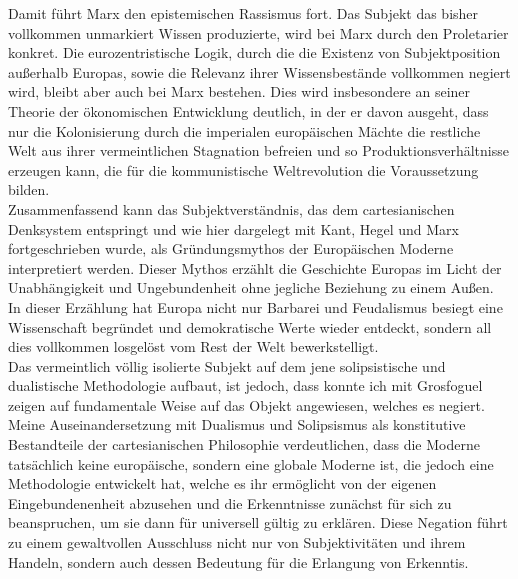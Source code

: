 \noindent Damit führt Marx den epistemischen Rassismus fort. Das Subjekt das bisher
vollkommen unmarkiert Wissen produzierte, wird bei Marx durch den Proletarier
konkret. Die eurozentristische Logik, durch die die Existenz von
Subjektposition außerhalb Europas, sowie die Relevanz ihrer Wissensbestände
vollkommen negiert wird, bleibt aber auch bei Marx bestehen.\footnotemark {}  Dies wird
insbesondere an seiner Theorie der ökonomischen Entwicklung deutlich, in der er
davon ausgeht, dass nur die Kolonisierung durch die imperialen europäischen
Mächte die restliche Welt aus ihrer vermeintlichen Stagnation befreien und so
Produktionsverhältnisse erzeugen kann, die für die kommunistische
Weltrevolution die Voraussetzung bilden.\\

\noindent Zusammenfassend kann das Subjektverständnis, das dem cartesianischen Denksystem
entspringt und wie hier dargelegt mit Kant, Hegel und Marx fortgeschrieben
wurde, als Gründungsmythos der Europäischen Moderne interpretiert werden.\footnotemark {} 
Dieser Mythos erzählt die Geschichte Europas im Licht der Unabhängigkeit und
Ungebundenheit ohne jegliche Beziehung zu einem Außen.\\
 In dieser Erzählung hat
Europa nicht nur Barbarei und Feudalismus besiegt eine Wissenschaft begründet
und demokratische Werte wieder entdeckt, sondern all dies vollkommen losgelöst
vom Rest der Welt bewerkstelligt.\footnotemark {}\\
 Das vermeintlich völlig isolierte Subjekt
auf dem jene solipsistische und dualistische Methodologie aufbaut, ist jedoch,
dass konnte ich mit Grosfoguel zeigen auf fundamentale Weise auf das Objekt
angewiesen, welches es negiert.\\
 Meine Auseinandersetzung mit Dualismus und
Solipsismus als konstitutive Bestandteile der cartesianischen Philosophie
verdeutlichen, dass die Moderne tatsächlich keine europäische, sondern eine
globale Moderne ist, die jedoch eine Methodologie entwickelt hat, welche es ihr
ermöglicht von der eigenen Eingebundenenheit abzusehen und die Erkenntnisse
zunächst für sich zu beanspruchen, um sie dann für universell gültig zu
erklären. Diese Negation führt zu einem gewaltvollen Ausschluss nicht nur von
Subjektivitäten und ihrem Handeln, sondern auch dessen Bedeutung für die
Erlangung von Erkenntis.\\

